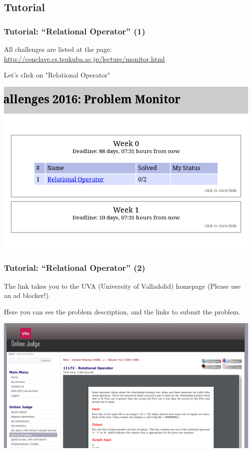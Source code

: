 \documentclass{beamer}
\begin{document}
\subsection{Tutorial}
\begin{frame}
  \frametitle{Tutorial: ``Relational Operator'' (1)}

  All challenges are listed at the page:\\
  {\smaller \url{http://conclave.cs.tsukuba.ac.jp/lecture/monitor.html}}

  \bigskip

  Let's click on "Relational Operator"

  \begin{center}
    \includegraphics[width=.7\textwidth]{../img/monitorpage}
  \end{center}

\end{frame}

\begin{frame}
  \frametitle{Tutorial: ``Relational Operator'' (2)}

  The link takes you to the UVA (University of Valladolid) homepage (\alert{Please use an ad blocker!}).

  \bigskip

  Here you can see the problem description, and the links to submit the problem.

  \begin{center}
    \includegraphics[width=.9\textwidth]{../img/relationaloperator}
  \end{center}
\end{frame}
\end{document}
